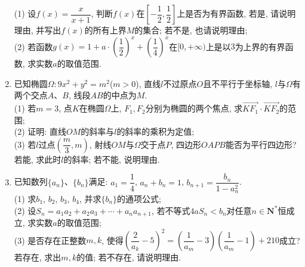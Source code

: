 \documentclass[10pt,a4paper]{article}
\begin{document}
\begin{enumerate}[1.]
(1) 设$f(x)=\dfrac x{x+1}$, 判断$f(x)$在$[-\dfrac 12, \dfrac 12]$上是否为有界函数, 若是, 请说明理由, 并写出$f(x)$的所有上界$M$的集合; 若不是, 也请说明理由;\\
(2) 若函数$g(x)=1+a\cdot (\dfrac 12)^x+(\dfrac 14)^x$在$[0, +\infty)$上是以$3$为上界的有界函数, 求实数$a$的取值范围.
\item 已知椭圆$\Omega:9x^2+y^2=m^2$($m>0$), 直线$l$不过原点$O$且不平行于坐标轴, $l$与$\Omega$有两个交点$A$、$B$, 线段$AB$的中点为$M$.\\
(1) 若$m=3$, 点$K$在椭圆$\Omega$上, $F_1,F_2$分别为椭圆的两个焦点, 求$\overrightarrow{KF_1}\cdot \overrightarrow{KF_2}$的范围;\\
(2) 证明: 直线$OM$的斜率与$l$的斜率的乘积为定值;\\
(3) 若$l$过点$(\dfrac m3,m)$, 射线$OM$与$\Omega$交于点$P$, 四边形$OAPB$能否为平行四边形? 若能, 求此时$l$的斜率; 若不能, 说明理由.
\item 已知数列$\{a_n\}$、$\{b_n\}$满足: $a_1=\dfrac 14$, $a_n+b_n=1$, $b_{n+1}=\dfrac{b_n}{1-a_n^2}$.\\
(1) 求$b_1$, $b_2$, $b_3$, $b_4$, 并求$\{b_n\}$的通项公式;\\
(2) 设$S_n=a_1a_2+a_2a_3+\cdots +a_na_{n+1}$, 若不等式$4aS_n<b_n$对任意$n\in \mathbf{N}^*$恒成立, 求实数$a$的取值范围;\\
(3) 是否存在正整数$m,k$, 使得$(\dfrac 2{a_k}-5)^2=(\dfrac 1{a_m}-3)(\dfrac 1{a_m}-1)+210$成立? 若存在, 求出$m,k$的值; 若不存在, 请说明理由.


\end{enumerate}
\end{document}
